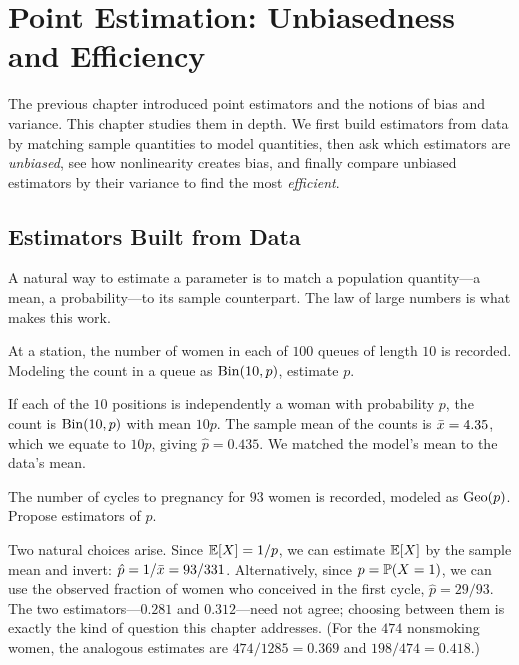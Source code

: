 \chapter{Point Estimation: Unbiasedness and Efficiency}
\label{ch:estimation}

The previous chapter introduced point estimators and the notions of bias and
variance. This chapter studies them in depth. We first build estimators from data
by matching sample quantities to model quantities, then ask which estimators are
\emph{unbiased}, see how nonlinearity creates bias, and finally compare
unbiased estimators by their variance to find the most \emph{efficient}.

\section{Estimators Built from Data}

A natural way to estimate a parameter is to match a population quantity—a mean, a
probability—to its sample counterpart. The law of large numbers is what makes
this work.

\begin{example}
At a station, the number of women in each of $100$ queues of length $10$ is
recorded. Modeling the count in a queue as $\mathrm{Bin}(10,p)$, estimate $p$.

\solution If each of the $10$ positions is independently a woman with probability
$p$, the count is $\mathrm{Bin}(10,p)$ with mean $10p$. The sample mean of the counts is
$\bar{x}=4.35$, which we equate to $10p$, giving $\hat p=0.435$. We matched the
model's mean to the data's mean.
\end{example}

\begin{example}
The number of cycles to pregnancy for $93$ women is recorded, modeled as
$\mathrm{Geo}(p)$. Propose estimators of $p$.

\solution Two natural choices arise. Since $\mathbb{E}[X]=1/p$, we can estimate $\mathbb{E}[X]$
by the sample mean and invert: $\hat p=1/\bar{x}=93/331$. Alternatively, since
$p=\mathbb{P}(X=1)$, we can use the observed fraction of women who conceived in the
first cycle, $\hat p=29/93$. The two estimators—$0.281$ and $0.312$—need not
agree; choosing between them is exactly the kind of question this chapter
addresses. (For the $474$ nonsmoking women, the analogous estimates are
$474/1285=0.369$ and $198/474=0.418$.)
\end{example}

